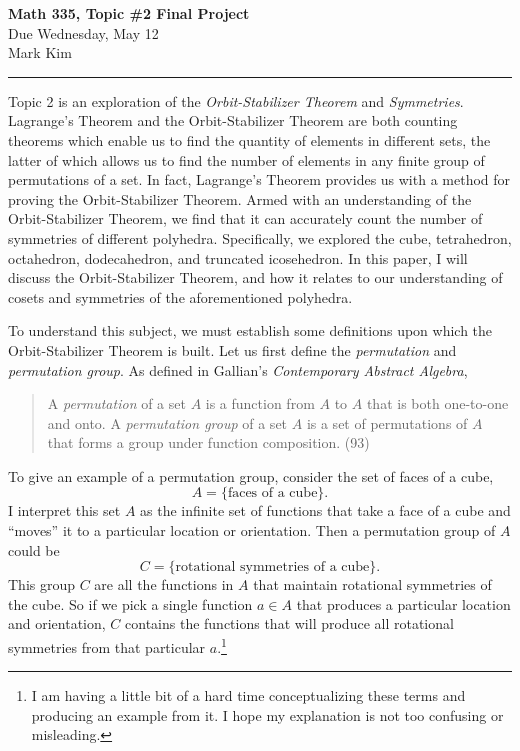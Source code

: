 \documentclass[11pt,twoside]{article}
\begin{document}
\begin{center}
{\bf \Large Math 335, Topic \#2 Final Project}\\
\vspace{0.1in}
{\Large Due Wednesday, May 12}\\
\vspace{0.1cm}
{\large Mark Kim}
\end{center}

\hrule

\vspace{.2in}

Topic 2 is an exploration of the \emph{Orbit-Stabilizer Theorem} and \emph{Symmetries}.  Lagrange's Theorem and the Orbit-Stabilizer Theorem are both counting theorems which enable us to find the quantity of elements in different sets, the latter of which allows us to find the number of elements in any finite group of permutations of a set.  In fact, Lagrange's Theorem provides us with a method for proving the Orbit-Stabilizer Theorem.  Armed with an understanding of the Orbit-Stabilizer Theorem, we find that it can accurately count the number of symmetries of different polyhedra.  Specifically, we explored the cube, tetrahedron, octahedron, dodecahedron, and truncated icosehedron.  In this paper, I will discuss the Orbit-Stabilizer Theorem, and how it relates to our understanding of cosets and symmetries of the aforementioned polyhedra.

To understand this subject, we must establish some definitions upon which the Orbit-Stabilizer Theorem is built.  Let us first define the \emph{permutation} and \emph{permutation group}.  As defined in Gallian's \emph{Contemporary Abstract Algebra},
\begin{quote}
A \emph{permutation} of a set $A$ is a function from $A$ to $A$ that is both one-to-one and onto.  A \emph{permutation group} of a set $A$ is a set of permutations of $A$ that forms a group under function composition. (93)
\end{quote}
To give an example of a permutation group, consider the set of faces of a cube,
\[ A = \{ \text{faces of a cube} \}. \]
I interpret this set $A$ as the infinite set of functions that take a face of a cube and ``moves'' it to a particular location or orientation.  Then a permutation group of $A$ could be
\[ C = \{ \text{rotational symmetries of a cube} \}. \]
This group $C$ are all the functions in $A$ that maintain rotational symmetries of the cube.  So if we pick a single function $a\in A$ that produces a particular location and orientation, $C$ contains the functions that will produce all rotational symmetries from that particular $a$.\footnote{I am having a little bit of a hard time conceptualizing these terms and producing an example from it.  I hope my explanation is not too confusing or misleading.}
\end{document}
